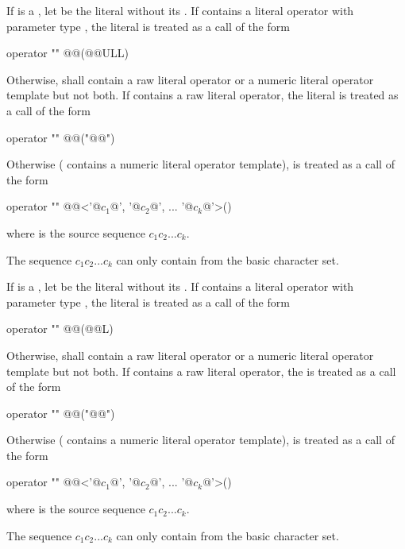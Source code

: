 \documentclass{wg21}
\begin{document}
\pnum
If  is a , let  be the literal
without its . If  contains a literal operator with
parameter type , the literal  is treated as a call of
the form
\begin{codeblock}
    operator "" @@(@@ULL)
\end{codeblock}
Otherwise,  shall contain a raw literal operator
or a numeric literal operator template but not both.
If  contains a raw literal operator,
the literal  is treated as a call of the form
\begin{codeblock}
    operator "" @@("@@")
\end{codeblock}
Otherwise ( contains a numeric literal operator template),
 is treated as a call of the form
\begin{codeblock}
    operator "" @@<'@$c_1$@', '@$c_2$@', ... '@$c_k$@'>()
\end{codeblock}
where  is the source  sequence $c_1c_2...c_k$.
\begin{note}
    The sequence
    $c_1c_2...c_k$ can only contain  from the basic character set.
\end{note}

\pnum
If  is a , let  be the
literal without its . If  contains a literal operator
with parameter type , the literal  is treated as a call of
the form
\begin{codeblock}
    operator "" @@(@@L)
\end{codeblock}
Otherwise,  shall contain a raw literal operator
or a numeric literal operator template but not both.
If  contains a raw literal operator,
the   is treated as a call of the form
\begin{codeblock}
    operator "" @@("@@")
\end{codeblock}
Otherwise ( contains a numeric literal operator template),
 is treated as a call of the form
\begin{codeblock}
    operator "" @@<'@$c_1$@', '@$c_2$@', ... '@$c_k$@'>()
\end{codeblock}
where  is the source  sequence $c_1c_2...c_k$.
\begin{note}
    The sequence
    $c_1c_2...c_k$ can only contain  from the basic character set.
\end{note}
\end{document}

